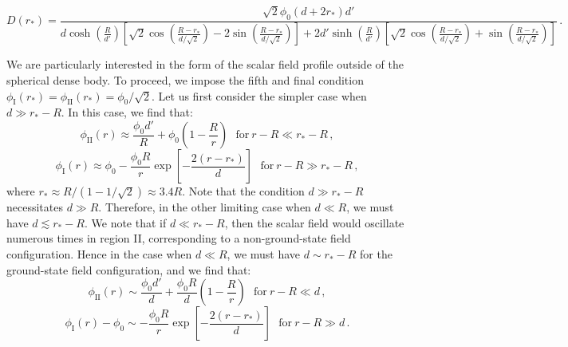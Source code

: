 \documentclass[aps,prd,onecolumn,nofootinbib]{revtex4-2} %
\begin{document}
\begin{equation}
\label{coeffn-D_Strong}
D (r_*) = 
\frac{ \sqrt{2} \phi_0 \left(d + 2r_* \right) d' }
{ d \cosh \left( \frac{R}{d'} \right) \left[ \sqrt{2} \cos \left( \frac{R - r_*}{d / \sqrt{2}} \right) - 2 \sin \left( \frac{R - r_*}{d / \sqrt{2}} \right) \right] + 2d' \sinh \left( \frac{R}{d'} \right) \left[ \sqrt{2} \cos \left( \frac{R - r_*}{d / \sqrt{2}} \right) + \sin \left( \frac{R - r_*}{d / \sqrt{2}} \right) \right] }  \, . 
\end{equation}

We are particularly interested in the form of the scalar field profile outside of the spherical dense body. 
To proceed, we impose the fifth and final condition $\phi_\textrm{I} (r_*) = \phi_\textrm{II} (r_*) = \phi_0 / \sqrt{2}$. 
Let us first consider the simpler case when $d \gg r_* - R$. 
In this case, we find that: 
\begin{equation}
\label{scalar_profile_strong_screening_App-1}
\phi_\textrm{II}(r) \approx \frac{\phi_0 d'}{R} + \phi_0 \left( 1 - \frac{R}{r} \right)  ~~~\textrm{for} ~ r - R \ll r_* - R  \, , 
\end{equation}
\begin{equation}
\label{scalar_profile_strong_screening_App-1B}
\phi_\textrm{I}(r) \approx \phi_0 - \frac{\phi_0 R}{r} \exp \left[ - \frac{2 \left( r - r_* \right)}{d} \right]  ~~~\textrm{for} ~ r - R \gg r_* - R  \, , 
\end{equation}
where $r_* \approx R / (1 - 1 / \sqrt{2}) \approx 3.4 R$. 
Note that the condition $d \gg r_* - R$ necessitates $d \gg R$. 
Therefore, in the other limiting case when $d \ll R$, we must have $d \lesssim r_* - R$. 
We note that if $d \ll r_* - R$, then the scalar field would oscillate numerous times in region II, corresponding to a non-ground-state field configuration. 
Hence in the case when $d \ll R$, we must have $d \sim r_* - R$ for the ground-state field configuration, and we find that: 
\begin{equation}
\label{scalar_profile_strong_screening_App-2}
\phi_\textrm{II}(r) \sim \frac{\phi_0 d'}{d} + \frac{\phi_0 R}{d} \left( 1 - \frac{R}{r} \right)  ~~~\textrm{for} ~ r - R \ll d  \, , 
\end{equation}
\begin{equation}
\label{scalar_profile_strong_screening_App-2B}
\phi_\textrm{I}(r) - \phi_0 \sim - \frac{\phi_0 R}{r} \exp \left[ - \frac{2 \left( r - r_* \right)}{d} \right]  ~~~\textrm{for} ~ r - R \gg d  \, . 
\end{equation}
\end{document}
